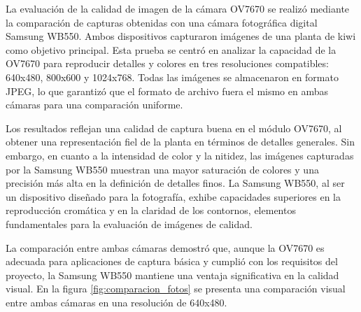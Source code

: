 La evaluación de la calidad de imagen de la cámara OV7670 se realizó mediante la comparación de capturas obtenidas con una cámara fotográfica digital Samsung WB550. Ambos dispositivos capturaron imágenes de una planta de kiwi como objetivo principal. Esta prueba se centró en analizar la capacidad de la OV7670 para reproducir detalles y colores en tres resoluciones compatibles: 640x480, 800x600 y 1024x768. Todas las imágenes se almacenaron en formato JPEG, lo que garantizó que el formato de archivo fuera el mismo en ambas cámaras para una comparación uniforme.

Los resultados reflejan una calidad de captura buena en el módulo OV7670, al obtener una representación fiel de la planta en términos de detalles generales. Sin embargo, en cuanto a la intensidad de color y la nitidez, las imágenes capturadas por la Samsung WB550 muestran una mayor saturación de colores y una precisión más alta en la definición de detalles finos. La Samsung WB550, al ser un dispositivo diseñado para la fotografía, exhibe capacidades superiores en la reproducción cromática y en la claridad de los contornos, elementos fundamentales para la evaluación de imágenes de calidad.

La comparación entre ambas cámaras demostró que, aunque la OV7670 es adecuada para aplicaciones de captura básica y cumplió con los requisitos del proyecto, la Samsung WB550 mantiene una ventaja significativa en la calidad visual. En la figura \ref{fig:comparacion_fotos} se presenta una comparación visual entre ambas cámaras en una resolución de 640x480.

\newpage

